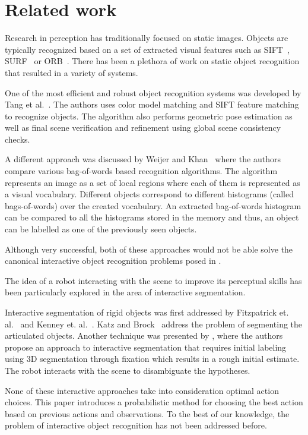\section{Related work}



    Research in perception has traditionally focused on static images. Objects are typically recognized based on a set of extracted visual features such as SIFT~\cite{lowe2004distinctive}, SURF~\cite{bay2006surf} or ORB~\cite{rublee2011orb}.
    There has been a plethora of work on static object recognition that resulted in a variety of systems.

    One of the most efficient and robust object recognition systems was developed by Tang et al.~\cite{tang2012textured}. The authors uses color model matching and SIFT feature matching to recognize objects. The algorithm also performs geometric pose estimation as well as final scene verification and refinement using global scene consistency checks. 

    A different approach was discussed by Weijer and Khan~\cite{van2013fusing} where the authors compare various bag-of-words based recognition algorithms. The algorithm represents an image as a set of local regions where each of them is represented as a visual vocabulary. Different objects correspond to different histograms (called bags-of-words) over the created vocabulary. An extracted bag-of-words histogram can be compared to all the histograms stored in the memory and thus, an object can be labelled as one of the previously seen objects.

    Although very successful, both of these approaches would not be able solve the canonical interactive object recognition problems posed in .

    The idea of a robot interacting with the scene to improve its perceptual skills has been particularly explored in the area of interactive segmentation.

    Interactive segmentation of rigid objects was first addressed by Fitzpatrick et. al.~\cite{fitzpatrick_active_vision} and Kenney et. al.~\cite{KenneyInteractive}. Katz and Brock~\cite{Katz-WS-MM-ICRA2011} address the problem of segmenting the articulated objects. Another technique was presented by \cite{bergstrom11icvs}, where the authors propose an approach to interactive segmentation that requires initial labeling using 3D segmentation through fixation which results in a rough initial estimate. The robot interacts with the scene to disambiguate the hypotheses.

    None of these interactive approaches take into consideration optimal action choices. This paper introduces a probabilistic method for choosing the best action based on previous actions and observations. To the best of our knowledge, the problem of interactive object recognition has not been addressed before.
